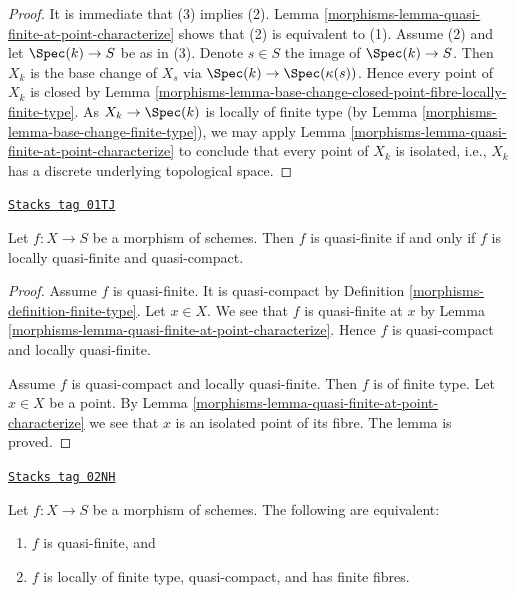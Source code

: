 \begin{proof}

It is immediate that (3) implies (2).
Lemma \ref{morphisms-lemma-quasi-finite-at-point-characterize}
shows that (2) is equivalent to (1).
Assume (2) and let $\Spec(k) \to S$ be as in (3).
Denote $s \in S$ the image  of $\Spec(k) \to S$.
Then $X_k$ is the base change of $X_s$ via
$\Spec(k) \to \Spec(\kappa(s))$. Hence every
point of $X_k$ is closed by
Lemma \ref{morphisms-lemma-base-change-closed-point-fibre-locally-finite-type}.
As $X_k \to \Spec(k)$ is locally of finite type (by
Lemma \ref{morphisms-lemma-base-change-finite-type}),
we may apply
Lemma \ref{morphisms-lemma-quasi-finite-at-point-characterize}
to conclude that every point of $X_k$ is isolated, i.e., $X_k$ has
a discrete underlying topological space.
\end{proof}

\begin{lemma}
\label{morphisms-lemma-quasi-finite-locally-quasi-compact}
\href{https://stacks.math.columbia.edu/tag/01TJ}{\texttt{Stacks tag 01TJ}}

Let $f : X \to S$ be a morphism of schemes.
Then $f$ is quasi-finite if and only if $f$ is
locally quasi-finite and quasi-compact.
\end{lemma}

\begin{proof}

Assume $f$ is quasi-finite. It is quasi-compact by Definition
\ref{morphisms-definition-finite-type}. Let $x \in X$.
We see that $f$ is quasi-finite at $x$ by
Lemma \ref{morphisms-lemma-quasi-finite-at-point-characterize}.
Hence $f$ is quasi-compact and locally quasi-finite.

\medskip\noindent
Assume $f$ is quasi-compact and locally quasi-finite.
Then $f$ is of finite type. Let $x \in X$ be a point.
By Lemma \ref{morphisms-lemma-quasi-finite-at-point-characterize}
we see that $x$ is an isolated point of its fibre.
The lemma is proved.
\end{proof}

\begin{lemma}
\label{morphisms-lemma-quasi-finite}
\href{https://stacks.math.columbia.edu/tag/02NH}{\texttt{Stacks tag 02NH}}

Let $f : X \to S$ be a morphism of schemes.
The following are equivalent:
\begin{enumerate}
\item $f$ is quasi-finite, and
\item $f$ is locally of finite type, quasi-compact, and has finite fibres.
\end{enumerate}
\end{lemma}

